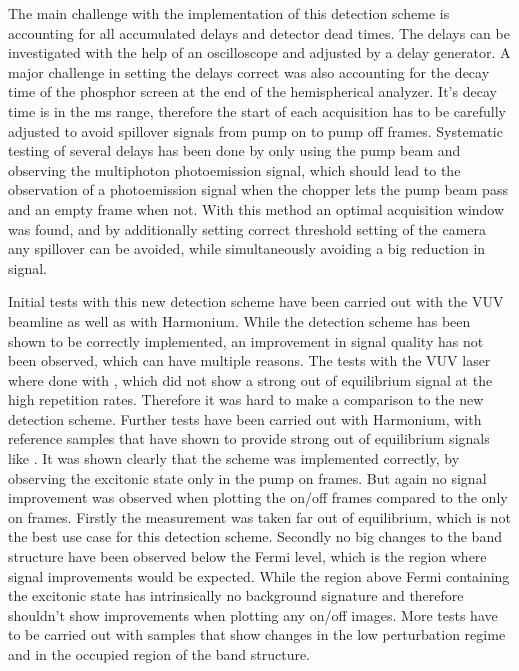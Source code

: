 The main challenge with the implementation of this detection scheme is accounting for all accumulated delays and detector dead times.
The delays can be investigated with the help of an oscilloscope and adjusted by a delay generator.
A major challenge in setting the delays correct was also accounting for the decay time of the phosphor screen at the end of the hemispherical analyzer.
It's decay time is in the \unit{\milli\second} range, therefore the start of each acquisition has to be carefully adjusted to avoid spillover signals from pump on to pump off frames.
Systematic testing of several delays has been done by only using the pump beam and observing the multiphoton photoemission signal, which should lead to the observation of a photoemission signal when the chopper lets the pump beam pass and an empty frame when not.
With this method an optimal acquisition window was found, and by additionally setting correct threshold setting of the camera any spillover can be avoided, while simultaneously avoiding a big reduction in signal.

Initial tests with this new detection scheme have been carried out with the VUV beamline as well as with Harmonium.
While the detection scheme has been shown to be correctly implemented, an improvement in signal quality has not been observed, which can have multiple reasons.
The tests with the VUV laser where done with , which did not show a strong out of equilibrium signal at the high repetition rates.
Therefore it was hard to make a comparison to the new detection scheme.
Further tests have been carried out with Harmonium, with reference samples that have shown to provide strong out of equilibrium signals like .
It was shown clearly that the scheme was implemented correctly, by observing the excitonic state only in the pump on frames.
But again no signal improvement was observed when plotting the on/off frames compared to the only on frames.
Firstly the measurement was taken far out of equilibrium, which is not the best use case for this detection scheme.
Secondly no big changes to the band structure have been observed below the Fermi level, which is the region where signal improvements would be expected.
While the region above Fermi containing the excitonic state has intrinsically no background signature and therefore shouldn't show improvements when plotting any on/off images.
More tests have to be carried out with samples that show changes in the low perturbation regime and in the occupied region of the band structure.